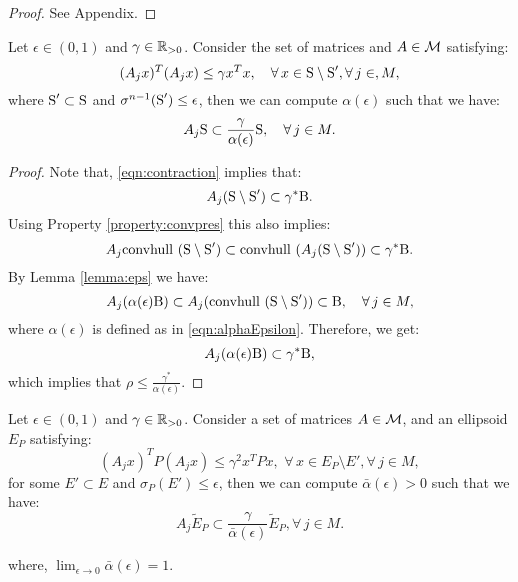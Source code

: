 \begin{proof}See Appendix.
\end{proof}

\begin{lemma}\label{lemma:epsilon1}Let $\epsilon \in (0, 1)$ and $\gamma \in \mathbb{R}_{> 0}$. Consider the set of matrices and $A \in \mathcal{M}$ satisfying:
\begin{equation}\label{eqn:contraction}(A_jx)^T(A_jx) \leq \gamma x^Tx, \quad \forall\, x \in \text{S} \setminus \text{S}', \forall\,j \in, M,\end{equation}
where $\text{S}' \subset \text{S}$ and $\sigma^{n-1}(\text{S}') \leq \epsilon$, then we can compute
$\alpha(\epsilon)$ such that we have:
\begin{equation*}
A_j \text{S} \subset \frac{\gamma}{\alpha(\epsilon)} \text{S},\quad \forall\, j \in M.
\end{equation*}
\end{lemma}

\begin{proof}Note that, \eqref{eqn:contraction} implies that:
$$A_j (\text{S} \setminus \text{S}') \subset \gamma^* \text{B}.$$
Using Property \ref{property:convpres} this also implies:
$$A_j \mbox{convhull }(\text{S} \setminus \text{S}') \subset \mbox{convhull }(A_j(\text{S} \setminus \text{S}')) \subset \gamma^* \text{B} .$$
By Lemma \ref{lemma:eps} we have:
$$A_j (\alpha(\epsilon) \text{B}) \subset A_j (\mbox{convhull } (\text{S} \setminus \text{S}')) \subset \text{B}, \quad  \forall\, j \in M,$$
where $\alpha(\epsilon)$ is defined as in \eqref{eqn:alphaEpsilon}. Therefore, we get:
$$A_j (\alpha(\epsilon) \text{B}) \subset \gamma^*\text{B},$$
which implies that $\rho \leq \frac{\gamma^*}{\alpha(\epsilon)}.$
\end{proof}


\begin{theorem}\label{thm:mainTheorem1}Let $\epsilon \in (0,1)$ and $\gamma \in \mathbb{R}_{> 0}$. Consider a set of matrices $A \in \mathcal{M}$, and an ellipsoid $E_P$ satisfying:
\begin{equation}\label{eqn:ellipsoid}(A_j x)^TP(A_j x) \leq \gamma^2x^TPx,\,\, \forall\, x \in E_P \setminus E', \forall\, j \in M, \end{equation}
for some $E' \subset E$ and $\sigma_P(E') \leq \epsilon$, then we can compute $\bar{\alpha}(\epsilon) > 0$ such that we have:
\begin{equation}\label{eqn:contractionEllipsoid}A_j \tilde{E}_P \subset \frac{\gamma}{\bar{\alpha}(\epsilon)}\tilde{E}_P, \forall\, j \in M.
\end{equation}
\end{theorem}
where, $\lim_{\epsilon \to 0} \bar{\alpha}(\epsilon) = 1$.


